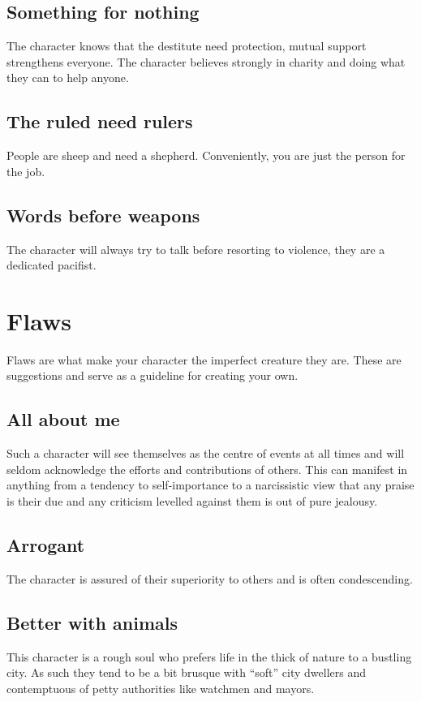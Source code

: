 \documentclass[a4paper,10pt,oneside]{book}
\begin{document}
\subsection{Something for nothing}
The character knows that the destitute need protection, mutual support strengthens everyone. The character believes strongly in charity and doing what they can to help anyone.

\subsection{The ruled need rulers}
People are sheep and need a shepherd. Conveniently, you are just the person for the job.

\subsection{Words before weapons}
The character will always try to talk before resorting to violence, they are a dedicated pacifist.



\section{Flaws}
\label{sec:flaws}
Flaws are what make your character the imperfect creature they are. These are suggestions and serve as a guideline for creating your own.

\subsection{All about me}
Such a character will see themselves as the centre of events at all times and will seldom acknowledge the efforts and contributions of others. This can manifest in anything from a tendency to self-importance to a narcissistic view that any praise is their due and any criticism levelled against them is out of pure jealousy. 

\subsection{Arrogant}
The character is assured of their superiority to others and is often condescending.

\subsection{Better with animals}
This character is a rough soul who prefers life in the thick of nature to a bustling city. As such they tend to be a bit brusque with ``soft'' city dwellers and contemptuous of petty authorities like watchmen and mayors.
\end{document}

